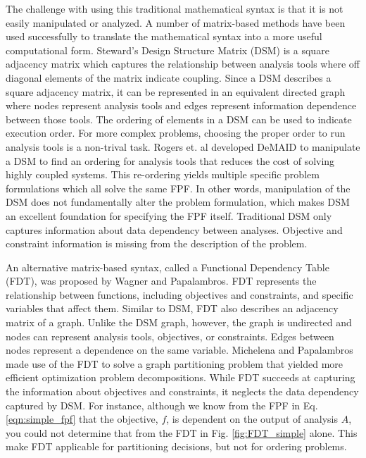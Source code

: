         The challenge with using this traditional mathematical syntax is that it is not easily manipulated or analyzed. 
        A number of matrix-based methods have been used successfully to translate the mathematical syntax into a more useful computational form. 
        Steward's Design Structure Matrix (DSM) is a square adjacency matrix which captures the relationship between analysis tools where off 
        diagonal elements of the matrix indicate coupling\cite{Steward1981}. Since a DSM describes a square adjacency matrix, 
        it can be represented in an equivalent directed graph where nodes represent analysis tools and 
        edges represent information dependence between those tools. The ordering of elements in a DSM can be used to indicate 
        execution order.  For more complex problems, choosing the proper order to run analysis tools is a non-trival task. 
        Rogers et. al developed DeMAID to manipulate a DSM to find an ordering for analysis tools that 
        reduces the cost of solving highly coupled systems\cite{Rogers1996}. This re-ordering yields multiple specific problem 
        formulations which all solve the same FPF. In other words, manipulation of the DSM does not fundamentally alter
        the problem formulation, which makes DSM an excellent foundation for specifying the FPF itself. Traditional DSM only captures information 
        about data dependency between analyses. Objective and constraint information is missing from the description of the problem. 
        
        An alternative matrix-based syntax, called a Functional Dependency Table (FDT), was proposed by Wagner and Papalambros. 
        FDT represents the relationship between functions, including objectives and constraints, and specific variables that affect 
        them\cite{Wagner1993}. Similar to DSM, FDT also describes an adjacency matrix of a graph. Unlike the DSM graph, 
        however, the graph is undirected and nodes can represent analysis tools, objectives, 
        or constraints. Edges between nodes represent a dependence on the same 
        variable. Michelena and Papalambros made use of the FDT to solve a graph partitioning problem that yielded 
        more efficient optimization problem decompositions\cite{Michelena1997}. While FDT succeeds at capturing the 
        information about objectives and constraints, it neglects the data dependency captured by DSM. For instance, 
        although we know from the FPF in Eq. \ref{eqn:simple_fpf} that the objective, $f$, is dependent on the 
        output of analysis $A$, you could not determine that from the FDT in Fig. \ref{fig:FDT_simple} alone. This make FDT 
        applicable for partitioning decisions, but not for ordering problems. 

